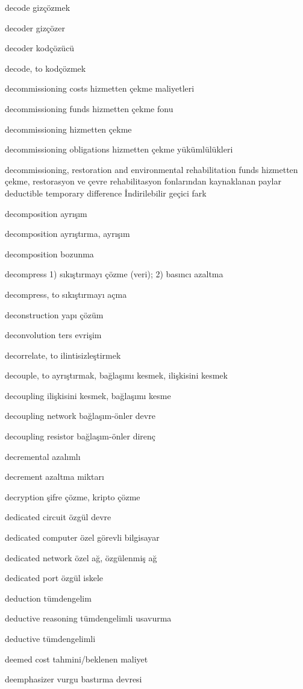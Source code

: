 \documentclass[12pt,fleqn]{article}\usepackage{../../common}
\begin{document}
decode gizçözmek

decoder gizçözer

decoder kodçözücü

decode, to kodçözmek

decommissioning costs hizmetten çekme maliyetleri

decommissioning funds hizmetten çekme fonu

decommissioning hizmetten çekme

decommissioning obligations hizmetten çekme yükümlülükleri

decommissioning, restoration and environmental rehabilitation funds hizmetten çekme, restorasyon ve çevre rehabilitasyon fonlarından kaynaklanan paylar deductible temporary difference İndirilebilir geçici fark

decomposition ayrışım

decomposition ayrıştırma, ayrışım

decomposition bozunma

decompress 1) sıkıştırmayı çözme (veri); 2) basıncı azaltma

decompress, to sıkıştırmayı açma

deconstruction yapı çözüm

deconvolution ters evrişim

decorrelate, to ilintisizleştirmek

decouple, to ayrıştırmak, bağlaşımı kesmek, ilişkisini kesmek

decoupling ilişkisini kesmek, bağlaşımı kesme

decoupling network bağlaşım-önler devre

decoupling resistor bağlaşım-önler direnç

decremental azalımlı

decrement azaltma miktarı

decryption şifre çözme, kripto çözme

dedicated circuit özgül devre

dedicated computer özel görevli bilgisayar

dedicated network özel ağ, özgülenmiş ağ

dedicated port özgül iskele

deduction tümdengelim

deductive reasoning tümdengelimli usavurma

deductive tümdengelimli

deemed cost tahmini/beklenen maliyet

deemphasizer vurgu bastırma devresi
\end{document}
